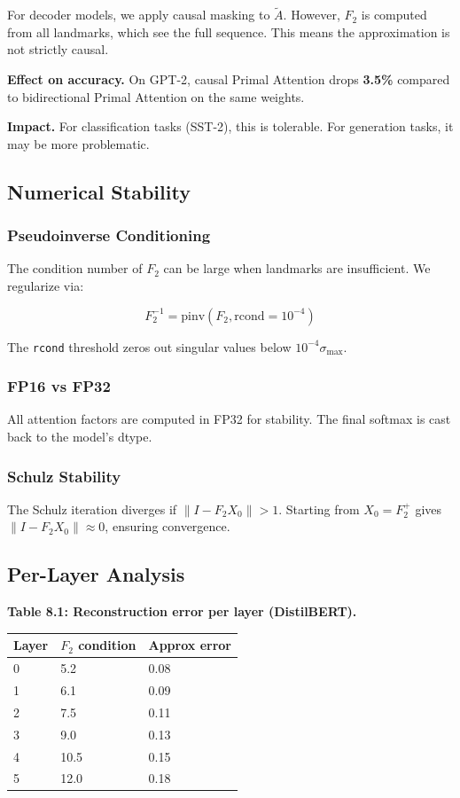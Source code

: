 For decoder models, we apply causal masking to $\tilde{A}$. However, 
$F_2$ is computed from all landmarks, which see the full sequence. This 
means the approximation is not strictly causal.

\textbf{Effect on accuracy.} On GPT-2, causal Primal Attention drops 
\textbf{3.5\%} compared to bidirectional Primal Attention on the 
same weights.

\textbf{Impact.} For classification tasks (SST-2), this is tolerable. For 
generation tasks, it may be more problematic.

\subsection{Numerical Stability}

\subsubsection{Pseudoinverse Conditioning}

The condition number of $F_2$ can be large when landmarks are 
insufficient. We regularize via:

\[
F_2^{-1} = \text{pinv}(F_2, \text{rcond}=10^{-4})
\]

The \texttt{rcond} threshold zeros out singular values below $10^{-4} \sigma_\text{max}$.

\subsubsection{FP16 vs FP32}

All attention factors are computed in FP32 for stability. The final softmax 
is cast back to the model's dtype.

\subsubsection{Schulz Stability}

The Schulz iteration diverges if $\|I - F_2 X_0\| > 1$. Starting from 
$X_0 = F_2^+$ gives $\|I - F_2 X_0\| \approx 0$, ensuring convergence.

\subsection{Per-Layer Analysis}

\textbf{Table 8.1: Reconstruction error per layer (DistilBERT).}

\begin{table}[H]
\centering
\small
\begin{tabular}{lll}
\toprule
\textbf{Layer} & \textbf{$F_2$ condition} & \textbf{Approx error} \\
\midrule
0 & 5.2 & 0.08 \\
1 & 6.1 & 0.09 \\
2 & 7.5 & 0.11 \\
3 & 9.0 & 0.13 \\
4 & 10.5 & 0.15 \\
5 & 12.0 & 0.18 \\
\bottomrule
\end{tabular}
\end{table}

